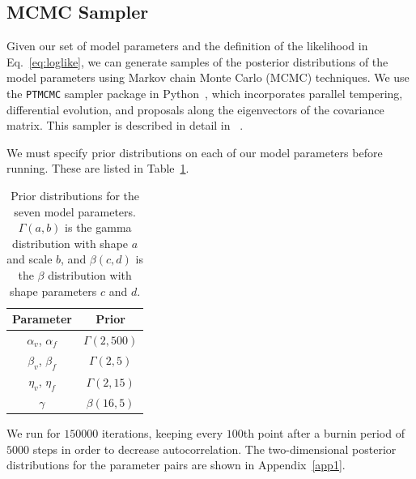 \documentclass[nofootinbib,aps,pre,twocolumn,superscriptaddress,showkeys,showpacs]{revtex4-1}
\begin{document}
\subsection{MCMC Sampler \label{subsec:MCMC}}
Given our set of model parameters and the definition of the likelihood in Eq.~\ref{eq:loglike}, we can generate samples of the posterior distributions of the model parameters using Markov chain Monte Carlo (MCMC) techniques. We use the \texttt{PTMCMC} sampler package in Python~\cite{PTMCMC}, which incorporates parallel tempering, differential evolution, and proposals along the eigenvectors of the covariance matrix. This sampler is described in detail in ~\cite{Arzoumanian2014}.

We must specify prior distributions on each of our model parameters before running. These are listed in Table~\ref{table:priors}. 
\begin{table}
\begin{center}
\begin{tabular}{ c|c }  
Parameter & Prior \\
 \hline
 $\alpha_v$, $\alpha_f$ & $\Gamma(2,500)$ \\ 
 $\beta_v$, $\beta_f$ &$ \Gamma(2,5)$ \\ 
 $\eta_v$, $\eta_f$&$ \Gamma(2,15)$ \\ 
 $\gamma$ & $\beta(16,5)$ \\
 \hline
\end{tabular}
\caption{Prior distributions for the seven model parameters. $\Gamma(a,b)$ is the gamma distribution with shape $a$ and scale $b$, and $\beta(c,d)$ is the $\beta$ distribution with shape parameters $c$ and $d$. \label{table:priors}}
\end{center}
\end{table}

We run for $150000$ iterations, keeping every $100$th point after a burnin period of $5000$ steps in order to decrease autocorrelation. The two-dimensional posterior distributions for the parameter pairs are shown in Appendix~\ref{app1}.
\end{document}
